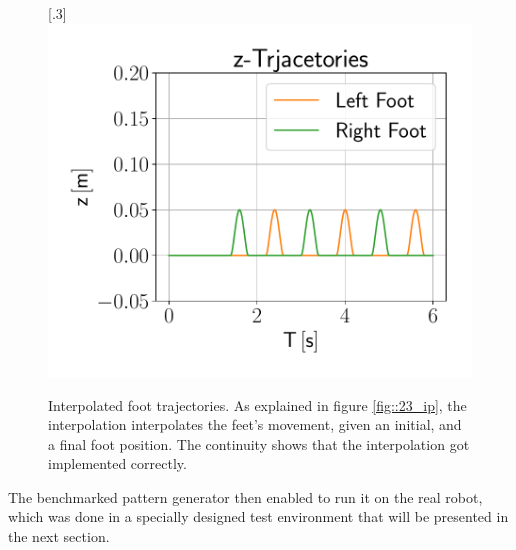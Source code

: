 \begin{figure}[h!]
	[.3\linewidth]{\includegraphics[scale=.3]{chapters/09_user_controlled_walking_experiments/img/01_benchmarking/interpolated_z_trajectories.pdf}}
	\caption{Interpolated foot trajectories. As explained in figure \ref{fig::23_ip}, the interpolation interpolates the feet's movement, given an initial, and a final foot position. The continuity shows that the interpolation got implemented correctly.}
	\label{fig::91_benchmarking_inter}
\end{figure}
The benchmarked pattern generator then enabled to run it on the real robot, which was done in a specially designed test environment that will be presented in the next section.
\FloatBarrier
